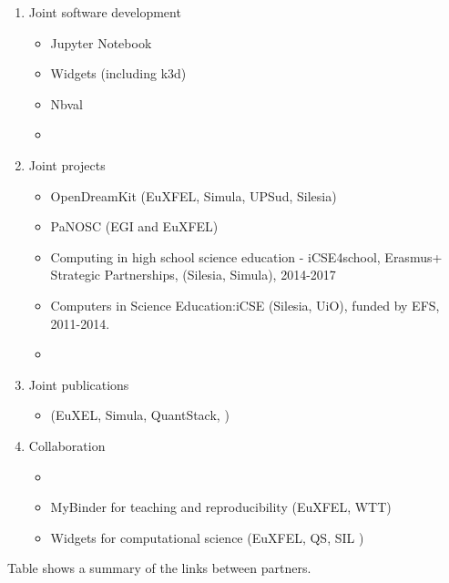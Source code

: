 \begin{enumerate}
\item Joint software development
  \begin{itemize}
  \item Jupyter Notebook 
  \item Widgets (including k3d)
  \item Nbval
  \item {}
  \end{itemize}

\item Joint projects
  \begin{itemize}
  \item OpenDreamKit (EuXFEL, Simula, UPSud, Silesia)
  \item PaNOSC (EGI and EuXFEL)
  \item Computing in high school science education - iCSE4school, Erasmus+ Strategic Partnerships, (Silesia, Simula), 2014-2017
  \item Computers in Science Education:iCSE (Silesia, UiO), funded by EFS, 2011-2014.
  \item {}
  \end{itemize}
\item Joint publications
  \begin{itemize}
  \item \cite{Kluyver2017} (EuXEL, Simula, QuantStack, )
  \end{itemize}

\item Collaboration
  \begin{itemize}
  \item {}

  \item MyBinder for teaching and reproducibility (EuXFEL, WTT)
  \item Widgets for computational science (EuXFEL, QS, SIL )
  \end{itemize}
\end{enumerate}

Table  shows a summary of the links
between partners.


